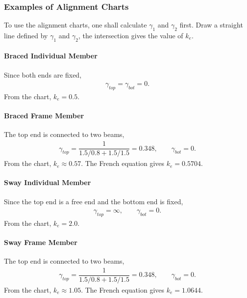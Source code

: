 \subsubsection{Examples of Alignment Charts}
To use the alignment charts, one shall calculate $\gamma_1$ and $\gamma_2$ first. Draw a straight line defined by $\gamma_1$ and $\gamma_2$, the intersection gives the value of $k_e$.
\paragraph{Braced Individual Member}
Since both ends are fixed,
\begin{gather*}
\gamma_{top}=\gamma_{bot}=0.
\end{gather*}
From the chart, $k_e=0.5$.
\begin{figure}[H]
\centering

\end{figure}
\paragraph{Braced Frame Member}
The top end is connected to two beams,
\begin{gather*}
\gamma_{top}=\dfrac{1}{1.5/0.8+1.5/1.5}=0.348,\qquad
\gamma_{bot}=0.
\end{gather*}
From the chart, $k_e\approx0.57$. The French equation gives $k_e=0.5704$.
\begin{figure}[H]
\centering

\end{figure}
\paragraph{Sway Individual Member}
Since the top end is a free end and the bottom end is fixed,
\begin{gather*}
\gamma_{top}=\infty,\qquad\gamma_{bot}=0.
\end{gather*}
From the chart, $k_e=2.0$.
\begin{figure}[H]
\centering

\end{figure}
\paragraph{Sway Frame Member}
The top end is connected to two beams,
\begin{gather*}
\gamma_{top}=\dfrac{1}{1.5/0.8+1.5/1.5}=0.348,\qquad
\gamma_{bot}=0.
\end{gather*}
From the chart, $k_e\approx1.05$. The French equation gives $k_e=1.0644$.
\begin{figure}[H]
\centering

\end{figure}
